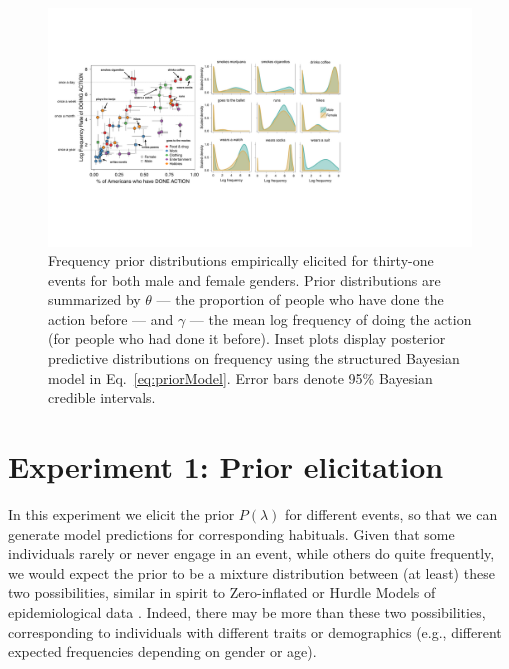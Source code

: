 \documentclass[10pt,letterpaper]{article}
\begin{document}
\begin{figure}[t]
\centering
  \includegraphics[width=\textwidth]{prior-scatter-insets3}
  \caption{Frequency prior distributions empirically elicited for thirty-one events for both male and female genders. Prior distributions are summarized by $\theta$ --- the proportion of people who have done the action before --- and $\gamma$ --- the mean log frequency of doing the action (for people who had done it before).  Inset plots display posterior predictive distributions on frequency using the structured Bayesian model in Eq.~\ref{eq:priorModel}. Error bars denote 95\% Bayesian credible intervals.}
  \label{fig:priorScatter}
\end{figure}
%


\section{Experiment 1: Prior elicitation}

%
In this experiment we elicit the prior $P(\lambda)$ for different events, so that we can generate model predictions for corresponding habituals.
Given that some individuals rarely or never engage in an event, while others do quite frequently, we would expect the prior to be a mixture distribution between (at least) these two possibilities, similar in spirit to Zero-inflated or Hurdle Models of epidemiological data \cite{hurdleModels}.
Indeed, there may be more than these two possibilities, corresponding to individuals with different traits or demographics (e.g., different expected frequencies depending on gender or age). 
\end{document}

